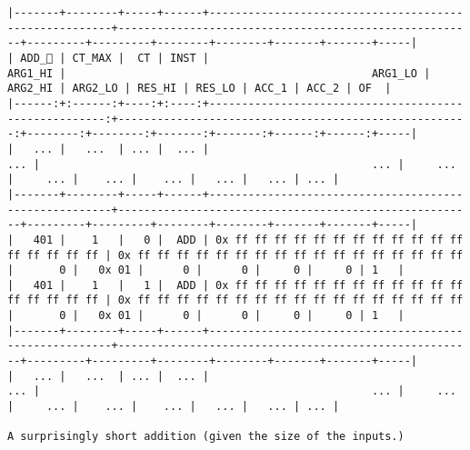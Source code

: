 \documentclass[varwidth=\maxdimen,margin=0.5cm,multi={verbatim}]{standalone}
\begin{document}
\begin{verbatim}
|-------+--------+-----+------+-------------------------------------------------------+-------------------------------------------------------+---------+---------+--------+--------+-------+-------+-----|
| ADD_ | CT_MAX |  CT | INST |                                               ARG1_HI |                                               ARG1_LO | ARG2_HI | ARG2_LO | RES_HI | RES_LO | ACC_1 | ACC_2 | OF  |
|------:+:------:+----:+:----:+------------------------------------------------------:+------------------------------------------------------:+--------:+--------:+-------:+-------:+------:+------:+-----|
|   ... |   ...  | ... |  ... |                                                   ... |                                                   ... |     ... |     ... |    ... |    ... |   ... |   ... | ... |
|-------+--------+-----+------+-------------------------------------------------------+-------------------------------------------------------+---------+---------+--------+--------+-------+-------+-----|
|   401 |    1   |   0 |  ADD | 0x ff ff ff ff ff ff ff ff ff ff ff ff ff ff ff ff ff | 0x ff ff ff ff ff ff ff ff ff ff ff ff ff ff ff ff ff |       0 |   0x 01 |      0 |      0 |     0 |     0 | 1   |
|   401 |    1   |   1 |  ADD | 0x ff ff ff ff ff ff ff ff ff ff ff ff ff ff ff ff ff | 0x ff ff ff ff ff ff ff ff ff ff ff ff ff ff ff ff ff |       0 |   0x 01 |      0 |      0 |     0 |     0 | 1   |
|-------+--------+-----+------+-------------------------------------------------------+-------------------------------------------------------+---------+---------+--------+--------+-------+-------+-----|
|   ... |   ...  | ... |  ... |                                                   ... |                                                   ... |     ... |     ... |    ... |    ... |   ... |   ... | ... |

A surprisingly short addition (given the size of the inputs.)
\end{verbatim}
\end{document}
